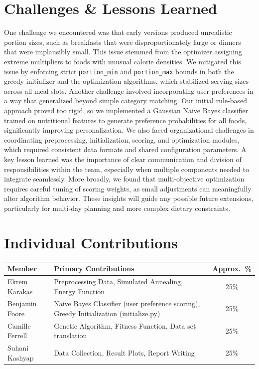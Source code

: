 \documentclass[11pt, letterpaper]{article}
\begin{document}
\section{Challenges \& Lessons Learned}
\begin{tcolorbox}[sectionbox, height=4.4cm, valign=top]
  One challenge we encountered was that early versions produced unrealistic portion sizes, such as breakfasts that were disproportionately large 
  or dinners that were implausibly small. This issue stemmed from the optimizer assigning extreme multipliers to foods with unusual calorie densities. 
  We mitigated this issue by enforcing strict \texttt{portion\_min} and \texttt{portion\_max} bounds in both the greedy initializer and the optimization algorithms, 
  which stabilized serving sizes across all meal slots. Another challenge involved incorporating user preferences in a way that generalized beyond simple category matching. 
  Our initial rule-based approach proved too rigid, so we implemented a Gaussian Naive Bayes classifier trained on nutritional features to generate preference probabilities 
  for all foods, significantly improving personalization. We also faced organizational challenges in coordinating preprocessing, initialization, scoring, and optimization modules, 
  which required consistent data formats and shared configuration parameters. A key lesson learned was the importance of clear communication and division of responsibilities within the team, 
  especially when multiple components needed to integrate seamlessly. More broadly, we found that multi-objective optimization requires careful tuning of scoring weights, 
  as small adjustments can meaningfully alter algorithm behavior. These insights will guide any possible future extensions, particularly for multi-day planning and more complex dietary constraints.
\end{tcolorbox}

\section{Individual Contributions}
\begin{tcolorbox}[sectionbox, height=4.3cm, valign=top]
  \vspace{4pt}
  \centering
  \begin{tabularx}{0.95\textwidth}{l X c}
    \toprule
    \textbf{Member} & \textbf{Primary Contributions} & \textbf{Approx.\ \%} \\
    \midrule
    Ekrem Karakas & Preprocessing Data, Simulated Annealing, Energy Function          & 25\% \\
    Benjamin Foore & Naive Bayes Classifier (user preference scoring), Greedy Initialization (initialize.py)   & 25\% \\
    Camille Ferrell & Genetic Algorithm, Fitness Function, Data set translation & 25\% \\
    Suhani Kashyap & Data Collection, Result Plots, Report Writing  & 25\% \\
    \bottomrule
  \end{tabularx}
\end{tcolorbox}
\end{document}
